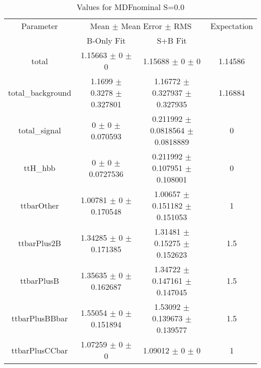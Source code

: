 \begin{table}
\centering
\caption{Values for MDFnominal S=0.0}
\begin{tabular}{cccc}
\toprule
Parameter & \multicolumn{2}{c}{Mean $\pm$ Mean Error $\pm$ RMS} & Expectation\\
 & B-Only Fit & S+B Fit & \\
\midrule
total & \num{1.15663} $\pm$ \num{0} $\pm$ \num{0} & \num{1.15688} $\pm$ \num{0} $\pm$ \num{0} & \num{1.14586}\\
total\_background & \num{1.1699} $\pm$ \num{0.3278} $\pm$ \num{0.327801} & \num{1.16772} $\pm$ \num{0.327937} $\pm$ \num{0.327935} & \num{1.16884}\\
total\_signal & \num{0} $\pm$ \num{0} $\pm$ \num{0.070593} & \num{0.211992} $\pm$ \num{0.0818564} $\pm$ \num{0.0818889} & \num{0}\\
ttH\_hbb & \num{0} $\pm$ \num{0} $\pm$ \num{0.0727536} & \num{0.211992} $\pm$ \num{0.107951} $\pm$ \num{0.108001} & \num{0}\\
ttbarOther & \num{1.00781} $\pm$ \num{0} $\pm$ \num{0.170548} & \num{1.00657} $\pm$ \num{0.151182} $\pm$ \num{0.151053} & \num{1}\\
ttbarPlus2B & \num{1.34285} $\pm$ \num{0} $\pm$ \num{0.171385} & \num{1.31481} $\pm$ \num{0.15275} $\pm$ \num{0.152623} & \num{1.5}\\
ttbarPlusB & \num{1.35635} $\pm$ \num{0} $\pm$ \num{0.162687} & \num{1.34722} $\pm$ \num{0.147161} $\pm$ \num{0.147045} & \num{1.5}\\
ttbarPlusBBbar & \num{1.55054} $\pm$ \num{0} $\pm$ \num{0.151894} & \num{1.53092} $\pm$ \num{0.139673} $\pm$ \num{0.139577} & \num{1.5}\\
ttbarPlusCCbar & \num{1.07259} $\pm$ \num{0} $\pm$ \num{0} & \num{1.09012} $\pm$ \num{0} $\pm$ \num{0} & \num{1}\\
\bottomrule
\end{tabular}
\end{table}